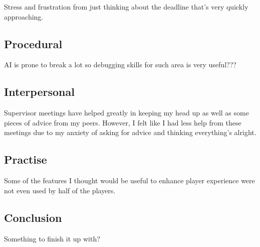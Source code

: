 \documentclass[journal]{IEEEtran}
\begin{document}
Stress and frustration from just thinking about the deadline that's very quickly approaching.

\subsection{Procedural}
AI is prone to break a lot so debugging skills for such area is very useful???

\subsection{Interpersonal}
Supervisor meetings have helped greatly in keeping my head up as well as some pieces of advice from my peers. However, I felt like I had less help from these meetings due to my anxiety of asking for advice and thinking everything's alright.

\subsection{Practise}
Some of the features I thought would be useful to enhance player experience were not even used by half of the players.

\subsection{Conclusion}
Something to finish it up with?


\end{document}
